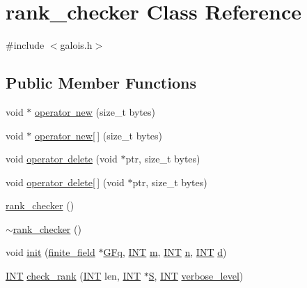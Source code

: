 \hypertarget{classrank__checker}{}\section{rank\+\_\+checker Class Reference}
\label{classrank__checker}


{\ttfamily \#include $<$galois.\+h$>$}

\subsection*{Public Member Functions}
\begin{DoxyCompactItemize}
\item 
void $\ast$ \mbox{\hyperlink{classrank__checker_aa762828c0e99fba787d1c67f40e9cb66}{operator new}} (size\+\_\+t bytes)
\item 
void $\ast$ \mbox{\hyperlink{classrank__checker_a7045b968cbee8c76a301052812c8f60e}{operator new\mbox{[}$\,$\mbox{]}}} (size\+\_\+t bytes)
\item 
void \mbox{\hyperlink{classrank__checker_aec5863002e43a21f998ecd0694174ebf}{operator delete}} (void $\ast$ptr, size\+\_\+t bytes)
\item 
void \mbox{\hyperlink{classrank__checker_a014143cb4f95e2be4160ad9ff2a0a0d5}{operator delete\mbox{[}$\,$\mbox{]}}} (void $\ast$ptr, size\+\_\+t bytes)
\item 
\mbox{\hyperlink{classrank__checker_aaad4380d7b7c9e078f48ae8bbf90537d}{rank\+\_\+checker}} ()
\item 
\mbox{\hyperlink{classrank__checker_a16f5e6c28f1382c31e3fc0ddd12f67fb}{$\sim$rank\+\_\+checker}} ()
\item 
void \mbox{\hyperlink{classrank__checker_a0fa39180d8de36ca46fd2cacdad914e2}{init}} (\mbox{\hyperlink{classfinite__field}{finite\+\_\+field}} $\ast$\mbox{\hyperlink{classrank__checker_a0478b884d4dd788e0240ffebe96b58b0}{G\+Fq}}, \mbox{\hyperlink{galois_8h_a09fddde158a3a20bd2dcadb609de11dc}{I\+NT}} \mbox{\hyperlink{classrank__checker_a3c584524970de26ecd182d426299661d}{m}}, \mbox{\hyperlink{galois_8h_a09fddde158a3a20bd2dcadb609de11dc}{I\+NT}} \mbox{\hyperlink{classrank__checker_a86416945933e955d430e95c30446cb60}{n}}, \mbox{\hyperlink{galois_8h_a09fddde158a3a20bd2dcadb609de11dc}{I\+NT}} \mbox{\hyperlink{classrank__checker_a7e17ed13389454e5738b06169b366386}{d}})
\item 
\mbox{\hyperlink{galois_8h_a09fddde158a3a20bd2dcadb609de11dc}{I\+NT}} \mbox{\hyperlink{classrank__checker_a5f0fd559a91a39c81268699c8ecadada}{check\+\_\+rank}} (\mbox{\hyperlink{galois_8h_a09fddde158a3a20bd2dcadb609de11dc}{I\+NT}} len, \mbox{\hyperlink{galois_8h_a09fddde158a3a20bd2dcadb609de11dc}{I\+NT}} $\ast$\mbox{\hyperlink{simeon_8_c_adab47f8243f1b5a2c31df2535d6b37d0}{S}}, \mbox{\hyperlink{galois_8h_a09fddde158a3a20bd2dcadb609de11dc}{I\+NT}} \mbox{\hyperlink{simeon_8_c_a818073fbcc2f439e7c56952f67386122}{verbose\+\_\+level}})

\end{DoxyCompactItemize}
